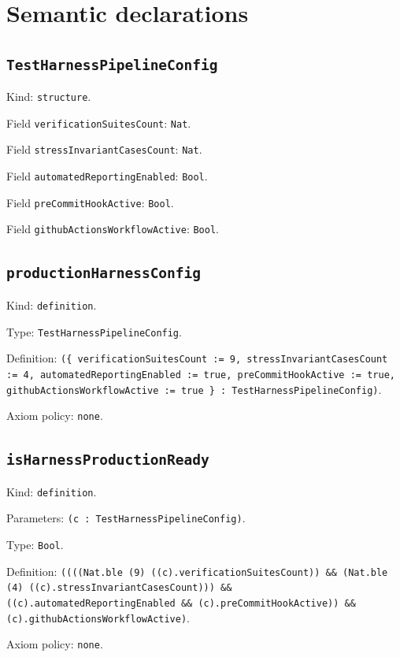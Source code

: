 \documentclass[11pt]{article}
\begin{document}
\section*{Semantic declarations}
\subsection*{\texttt{TestHarnessPipelineConfig}}
\noindent Kind: \texttt{structure}.\par
\noindent Field \texttt{verificationSuitesCount}: \texttt{Nat}.\par
\noindent Field \texttt{stressInvariantCasesCount}: \texttt{Nat}.\par
\noindent Field \texttt{automatedReportingEnabled}: \texttt{Bool}.\par
\noindent Field \texttt{preCommitHookActive}: \texttt{Bool}.\par
\noindent Field \texttt{githubActionsWorkflowActive}: \texttt{Bool}.\par
\subsection*{\texttt{productionHarnessConfig}}
\noindent Kind: \texttt{definition}.\par
\noindent Type: \texttt{TestHarnessPipelineConfig}.\par
\noindent Definition: \texttt{(\{ verificationSuitesCount := 9, stressInvariantCasesCount := 4, automatedReportingEnabled := true, preCommitHookActive := true, githubActionsWorkflowActive := true \} : TestHarnessPipelineConfig)}.\par
\noindent Axiom policy: \texttt{none}.\par
\subsection*{\texttt{isHarnessProductionReady}}
\noindent Kind: \texttt{definition}.\par
\noindent Parameters: \texttt{(c : TestHarnessPipelineConfig)}.\par
\noindent Type: \texttt{Bool}.\par
\noindent Definition: \texttt{((((Nat.ble (9) ((c).verificationSuitesCount)) \&\& (Nat.ble (4) ((c).stressInvariantCasesCount))) \&\& ((c).automatedReportingEnabled \&\& (c).preCommitHookActive)) \&\& (c).githubActionsWorkflowActive)}.\par
\noindent Axiom policy: \texttt{none}.\par
\end{document}
